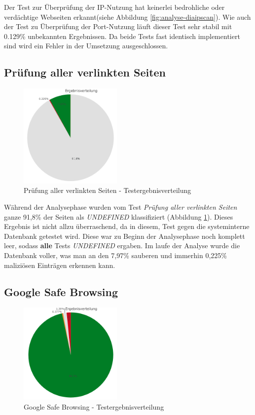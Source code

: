 Der Test zur Überprüfung der IP-Nutzung hat keinerlei bedrohliche oder verdächtige Webseiten erkannt(siehe Abbildung \ref{fig:analyse-diaipscan}). Wie auch der Test zu Überprüfung der Port-Nutzung läuft dieser Test sehr stabil mit 0.129\% unbekannten Ergebnissen. Da beide Tests fast identisch implementiert sind wird ein Fehler in der Umsetzung ausgeschlossen.

\subsection{Prüfung aller verlinkten Seiten}
\begin{figure}[H]
  \centering
  \includegraphics[width=5cm]{images/stats/dialinkchecker}
  \caption{Prüfung aller verlinkten Seiten - Testergebnisverteilung}
  \label{fig:analyse-dialinkchecker}
\end{figure}

Während der Analysephase wurden vom Test \textit{Prüfung aller verlinkten Seiten} ganze 91,8\% der
Seiten als \textit{UNDEFINED} klassifiziert (Abbildung \ref{fig:analyse-dialinkchecker}).
Dieses Ergebnis ist nicht allzu überraschend, da in diesem, Test gegen die systeminterne Datenbank getestet wird.
Diese war zu Beginn der Analysephase noch komplett leer, sodass \textbf{alle} Tests \textit{UNDEFINED} ergaben.
Im laufe der Analyse wurde die Datenbank voller, was man an den 7,97\% sauberen und immerhin
0,225\% maliziösen Einträgen erkennen kann.

\subsection{Google Safe Browsing}
\begin{figure}[H]
  \centering
  \includegraphics[width=5cm]{images/stats/diagoogle}
  \caption{Google Safe Browsing - Testergebnisverteilung}
  \label{fig:analyse-diagoogle}
\end{figure}

